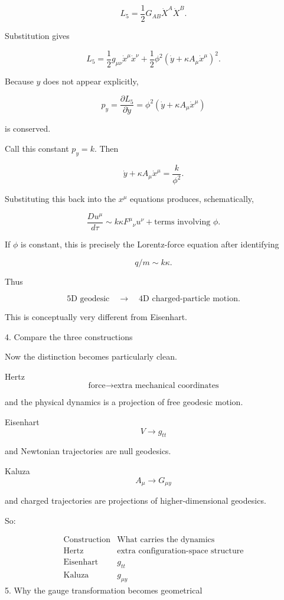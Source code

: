 $$ L_5= \frac12G_{AB}\dot X^A\dot X^B. $$

Substitution gives

$$ L_5= \frac12g_{\mu\nu}\dot x^\mu\dot x^\nu + \frac12\phi^2 \left( \dot y+\kappa A_\mu\dot x^\mu \right)^2. $$

Because \(y\) does not appear explicitly,

$$ p_y= \frac{\partial L_5}{\partial\dot y} = \phi^2 \left( \dot y+\kappa A_\mu\dot x^\mu \right) $$

is conserved.

Call this constant \(p_y=k\). Then

$$ \dot y+\kappa A_\mu\dot x^\mu = \frac{k}{\phi^2}. $$

Substituting this back into the \(x^\mu\) equations produces, schematically,

$$ \boxed{ \frac{D u^\mu}{d\tau} \sim k\kappa F^\mu{}_\nu u^\nu +\text{terms involving }\phi . } $$

If \(\phi\) is constant, this is precisely the Lorentz-force equation after identifying

$$ q/m\sim k\kappa . $$

Thus

$$ \boxed{ \text{5D geodesic} \quad\longrightarrow\quad \text{4D charged-particle motion}. } $$

This is conceptually very different from Eisenhart.

4. Compare the three constructions

Now the distinction becomes particularly clean.

Hertz
$$ \boxed{ \text{force} \longrightarrow \text{extra mechanical coordinates} } $$

and the physical dynamics is a projection of free geodesic motion.

Eisenhart
$$ \boxed{ V \longrightarrow g_{tt} } $$

and Newtonian trajectories are null geodesics.

Kaluza
$$ \boxed{ A_\mu \longrightarrow G_{\mu y} } $$

and charged trajectories are projections of higher-dimensional geodesics.

So:

$$ \begin{array}{c|c} \text{Construction}&\text{What carries the dynamics}\\ \hline \text{Hertz}&\text{extra configuration-space structure}\\ \text{Eisenhart}&g_{tt}\\ \text{Kaluza}&g_{\mu y} \end{array} $$
5. Why the gauge transformation becomes geometrical

